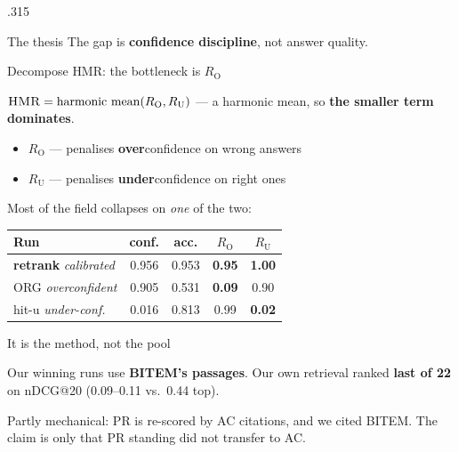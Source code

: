 \documentclass[final]{beamer}
\newcommand{\HMR}{\textsc{HMR}}
\newcommand{\RO}{R_{\mathrm{O}}}
\newcommand{\RU}{R_{\mathrm{U}}}
\begin{document}
\begin{frame}[t]
\begin{columns}[t]
\begin{column}{.315\paperwidth}
\begin{block}{The thesis}
{\vspace{0.6cm}
The gap is \textbf{confidence discipline}, not answer quality.
}
\end{block}

\begin{block}{Decompose \HMR: the bottleneck is $\RO$}
{\large
$\HMR = \mathrm{harmonic\ mean}(\RO,\RU)$ --- a harmonic mean, so \textbf{the
smaller term dominates}.

\vspace{0.4cm}
\begin{itemize}
  \item $\RO$ --- penalises \textbf{over}confidence on wrong answers
  \item $\RU$ --- penalises \textbf{under}confidence on right ones
\end{itemize}

\vspace{0.5cm}
Most of the field collapses on \emph{one} of the two:
}
\vspace{0.4cm}
\centering\normalsize
\begin{tabular}{lcccc}
\toprule
Run & conf. & acc. & $\RO$ & $\RU$\\
\midrule
\textbf{retrank} \emph{calibrated} & 0.956 & 0.953 & \color{good}\textbf{0.95} & \color{good}\textbf{1.00}\\
ORG \emph{overconfident} & 0.905 & 0.531 & \color{accent}\textbf{0.09} & 0.90\\
hit-u \emph{under-conf.} & 0.016 & 0.813 & 0.99 & \color{accent}\textbf{0.02}\\
\bottomrule
\end{tabular}
\end{block}

\begin{block}{It is the method, not the pool}
{\large
Our winning runs use \textbf{BITEM's passages}. Our own retrieval ranked
\textbf{last of 22} on nDCG@20 (0.09--0.11 vs.\ 0.44 top).

\vspace{0.5cm}
\centering
{}
\par\vspace{0.4cm}
\raggedright\normalsize Partly mechanical: PR is re-scored by AC citations, and we cited
BITEM. The claim is only that PR standing did not transfer to AC.
}
\end{block}



\end{column}
\end{columns}
\end{frame}
\end{document}
